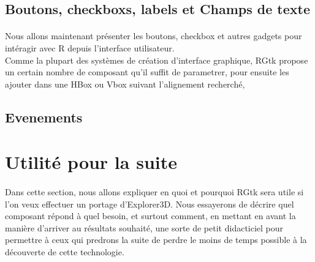 \documentclass{article}
\begin{document}
\subsection{Boutons, checkboxs, labels et Champs de texte}
\paragraph{} 
Nous allons maintenant présenter les boutons, checkbox et autres gadgets pour intéragir avec R depuis l'interface utilisateur. \\
Comme la plupart des systèmes de création d'interface graphique, RGtk propose un certain nombre de composant qu'il suffit de parametrer, pour ensuite les ajouter dans une HBox ou Vbox suivant l'alignement recherché, 

\subsection{Evenements }


\section{Utilité pour la suite}
\paragraph{}
Dans cette section, nous allons expliquer en quoi et pourquoi RGtk sera utile si l'on veux effectuer un portage d'Explorer3D. Nous essayerons de décrire quel composant répond à quel besoin, et surtout comment, en mettant en avant la manière d'arriver au résultats souhaité, une sorte de petit didacticiel pour permettre à ceux qui predrons la suite de perdre le moins de temps possible à la découverte de cette technologie.
\end{document}
